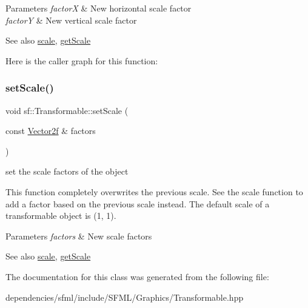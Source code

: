 \begin{DoxyParams}{Parameters}
{\em factorX} & New horizontal scale factor \\
\hline
{\em factorY} & New vertical scale factor\\
\hline
\end{DoxyParams}
\begin{DoxySeeAlso}{See also}
\hyperlink{classsf_1_1_transformable_a3de0c6d8957f3cf318092f3f60656391}{scale}, \hyperlink{classsf_1_1_transformable_a73819fdea80ca8a06fad8a0067b4588c}{get\+Scale} 
\end{DoxySeeAlso}
Here is the caller graph for this function\+:
\mbox{\label{classsf_1_1_transformable_a4c48a87f1626047e448f9c1a68ff167e}} 
\subsubsection{\texorpdfstring{set\+Scale()}{setScale()}\hspace{0.1cm}{\footnotesize\ttfamily [2/2]}}
{\footnotesize\ttfamily void sf\+::\+Transformable\+::set\+Scale (\begin{DoxyParamCaption}\item[{const \hyperlink{classsf_1_1_vector2}{Vector2f} \&}]{factors }\end{DoxyParamCaption})}



set the scale factors of the object 

This function completely overwrites the previous scale. See the scale function to add a factor based on the previous scale instead. The default scale of a transformable object is (1, 1).


\begin{DoxyParams}{Parameters}
{\em factors} & New scale factors\\
\hline
\end{DoxyParams}
\begin{DoxySeeAlso}{See also}
\hyperlink{classsf_1_1_transformable_a3de0c6d8957f3cf318092f3f60656391}{scale}, \hyperlink{classsf_1_1_transformable_a73819fdea80ca8a06fad8a0067b4588c}{get\+Scale} 
\end{DoxySeeAlso}


The documentation for this class was generated from the following file\+:\begin{DoxyCompactItemize}
\item 
dependencies/sfml/include/\+S\+F\+M\+L/\+Graphics/Transformable.\+hpp\end{DoxyCompactItemize}
